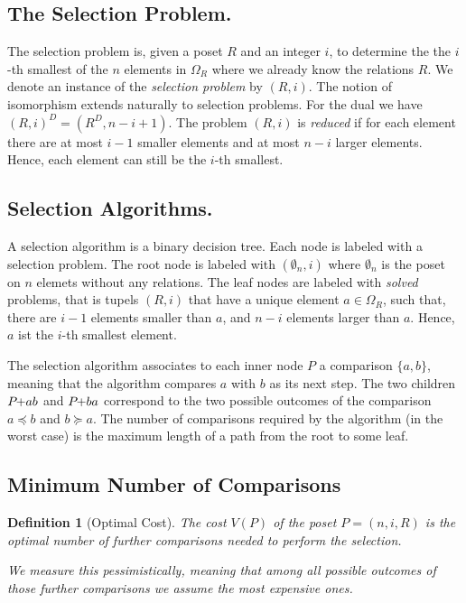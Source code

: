 \documentclass[twoside,leqno,twocolumn]{article}
\newcommand{\pchild}[3]{{#1}\kern-1pt{+}{#2}{#3}}
\newcommand{\dual}[1]{{#1}^{D}}
\newtheorem{definition}{Definition}[section]
\begin{document}
\subsection{The Selection Problem.}
The selection problem is, given a poset $R$ and an integer $i$, to determine the the $i$-th smallest of the $n$ elements in $\Omega_R$ where we already know the relations $R$.
We denote an instance of the \emph{selection problem} by $(R, i)$.
The notion of isomorphism extends naturally to selection problems.
For the dual we have $\dual{(R, i)} = (\dual{R}, n-i+1)$.
The problem $(R, i)$ is \emph{reduced} if for each element there are at most $i-1$ smaller elements and at most $n - i$ larger elements.
Hence, each element can still be the $i$-th smallest.



\subsection{Selection Algorithms.}
A selection algorithm is a binary decision tree.
Each node is labeled with a selection problem.
The root node is labeled with $(\emptyset_n, i)$ where $\emptyset_n$ is the poset on $n$ elemets without any relations.
The leaf nodes are labeled with \emph{solved} problems, that is tupels $(R, i)$ that have a unique element $a \in \Omega_R$, such that, there are $i-1$ elements smaller than $a$, and $n- i$ elements larger than $a$.
Hence, $a$ ist the $i$-th smallest element.

The selection algorithm associates to each inner node $P$ a comparison $\{a,b\}$, meaning that the algorithm compares $a$ with $b$ as its next step.
The two children $\pchild{P}{a}{b}$ and $\pchild{P}{b}{a}$ correspond to the two possible outcomes of the comparison $a \preceq b$ and $b \succeq a$.
The number of comparisons required by the algorithm (in the worst case) is the maximum length of a path from the root to some leaf.


\subsection{Minimum Number of Comparisons}

\begin{definition}[Optimal Cost]
  The cost $V(P)$ of the poset $P = (n, i, R)$ is the optimal number of further comparisons needed to perform the selection.

  We measure this pessimistically, meaning that among all possible outcomes of those further comparisons we assume the most expensive ones.
\end{definition}
\end{document}
